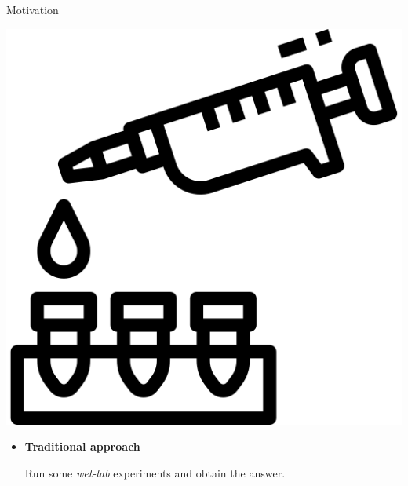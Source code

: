 \documentclass[10pt]{beamer}
\begin{document}
\begin{frame}[fragile]{Motivation}
\begin{minipage}{0.33\textwidth}
\begin{center}
\includegraphics[scale=0.1]{pics/pipette.png}
\end{center}
\end{minipage}
\hfill
\begin{minipage}{0.66\textwidth}
\begin{itemize}
	\item \textbf{Traditional approach}

	Run some \emph{wet-lab} experiments and obtain the answer.
\end{itemize}
\end{minipage}

\vspace*{0.5cm}


\end{frame}
\end{document}
